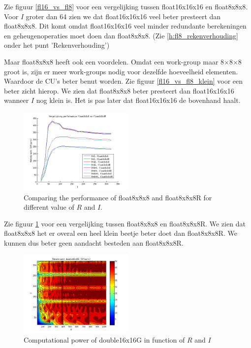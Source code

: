 \documentclass[11pt]{IEEEtran}
\begin{document}
Zie figuur \ref{fl16_vs_fl8} voor een vergelijking tussen float16x16x16 en float8x8x8. Voor $I$ groter dan 64 zien we dat float16x16x16 veel beter presteert dan float8x8x8. Dit komt omdat float16x16x16 veel minder redundante berekeningen en geheugenoperaties moet doen dan float8x8x8. (Zie \ref{h:fl8_rekenverhouding} onder het punt 'Rekenverhouding')

Maar float8x8x8 heeft ook een voordelen. Omdat een work-group maar 8$\times$8$\times$8 groot is, zijn er meer work-groups nodig voor dezelfde hoeveelheid elementen. Waardoor de CU's beter benut worden. Zie figuur \ref{fl16_vs_fl8_klein} voor een beter zicht hierop. We zien dat float8x8x8 beter presteert dan float16x16x16 wanneer $I$ nog klein is. Het is pas later dat float16x16x16 de bovenhand haalt.


\begin{figure}[h!]
\centering
\includegraphics[width=0.5\textwidth]{fl8_vs_fl8R}
\caption{\label{fl8_vs_fl8R} Comparing the performance of float8x8x8 and float8x8x8R for different value of $R$ and $I$.}
\end{figure}

Zie figuur \ref{fl8_vs_fl8R} voor een vergelijking tussen float8x8x8 en float8x8x8R. We zien dat float8x8x8 het er overal een heel klein beetje beter doet dan float8x8x8R. We kunnen dus beter geen aandacht besteden aan float8x8x8R.

\begin{figure}[h!]
\centering
\includegraphics[width=0.5\textwidth]{result_gradient}
\caption{\label{result_gradient} Computational power of double16x16G in function of $R$ and $I$}
\end{figure}
\end{document}
